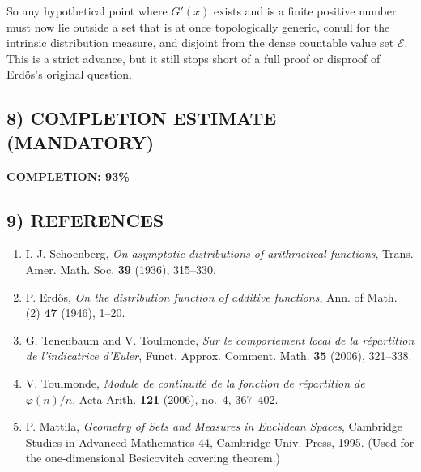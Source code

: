 So any hypothetical point where $G'(x)$ exists and is a finite positive number must now lie outside a set that is at once topologically generic, conull for the intrinsic distribution measure, and disjoint from the dense countable value set $\mathcal E$.
This is a strict advance, but it still stops short of a full proof or disproof of Erd\H{o}s's original question.

\subsection{8) COMPLETION ESTIMATE (MANDATORY)}

\textbf{COMPLETION: 93\%}

\subsection{9) REFERENCES}

\begin{enumerate}
\item I. J. Schoenberg, \emph{On asymptotic distributions of arithmetical functions}, Trans. Amer. Math. Soc. \textbf{39} (1936), 315--330.
\item P. Erd\H{o}s, \emph{On the distribution function of additive functions}, Ann. of Math. (2) \textbf{47} (1946), 1--20.
\item G. Tenenbaum and V. Toulmonde, \emph{Sur le comportement local de la r\'epartition de l'indicatrice d'Euler}, Funct. Approx. Comment. Math. \textbf{35} (2006), 321--338.
\item V. Toulmonde, \emph{Module de continuit\'e de la fonction de r\'epartition de $\varphi(n)/n$}, Acta Arith. \textbf{121} (2006), no.~4, 367--402.
\item P. Mattila, \emph{Geometry of Sets and Measures in Euclidean Spaces}, Cambridge Studies in Advanced Mathematics 44, Cambridge Univ. Press, 1995. (Used for the one-dimensional Besicovitch covering theorem.)
\end{enumerate}
